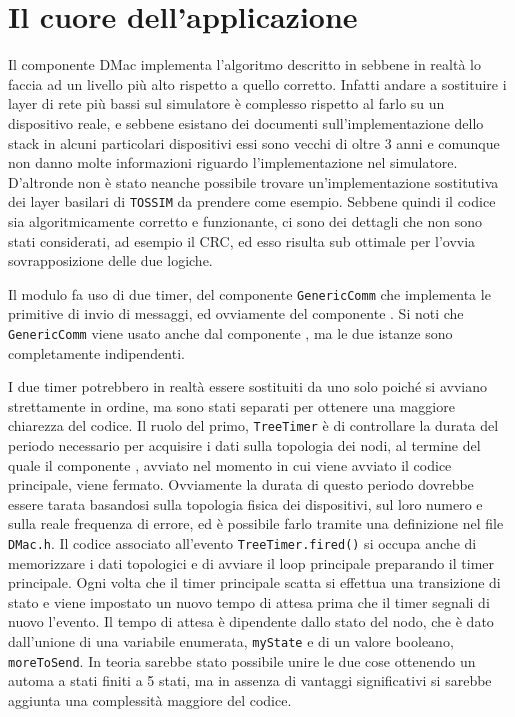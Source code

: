 \documentclass[twoside,11pt,a4paper,italian,openany]{book}
\newcommand{\tos}{\texttt{TOSSIM} }
\begin{document}
\section{Il cuore dell'applicazione}
Il componente DMac implementa l'algoritmo descritto in \cite{DMAC} sebbene in realtà lo faccia 
ad un livello più alto rispetto a quello corretto. Infatti andare a sostituire i layer di rete 
più bassi sul simulatore è complesso rispetto al farlo su un dispositivo reale, 
e sebbene esistano dei documenti sull'implementazione dello stack in alcuni particolari dispositivi\cite{stackpdf} essi sono vecchi di oltre 3 anni e comunque non danno molte informazioni 
riguardo l'implementazione nel simulatore. 
D'altronde non è stato neanche possibile trovare un'implementazione sostitutiva dei layer 
basilari di \tos da prendere come esempio. 
Sebbene quindi il codice sia algoritmicamente corretto e funzionante,
ci sono dei dettagli che non sono stati considerati, ad esempio il CRC, ed esso risulta 
sub ottimale per l'ovvia sovrapposizione delle due logiche. 

Il modulo fa uso di due timer, del componente \texttt{GenericComm}  che implementa le 
primitive di invio di messaggi, ed ovviamente del componente \tree. 
Si noti che \texttt{GenericComm} viene usato anche dal componente \tree, ma le due istanze sono completamente indipendenti.  

I due timer potrebbero in realtà essere sostituiti da uno solo poiché si avviano strettamente
in ordine, ma sono stati separati per ottenere una maggiore chiarezza del codice.
Il ruolo del primo, \texttt{TreeTimer} è di controllare la durata del periodo necessario per
acquisire i dati sulla topologia dei nodi, al termine del quale il componente \tree, avviato 
nel momento in cui viene avviato il codice principale, viene fermato.
Ovviamente la durata di questo periodo dovrebbe essere tarata basandosi sulla topologia fisica 
dei dispositivi, sul loro numero e sulla reale frequenza di errore, ed è possibile farlo 
tramite una definizione nel file \texttt{DMac.h}.
Il codice associato all'evento \texttt{TreeTimer.fired()} si occupa anche di memorizzare 
i dati topologici e di avviare il loop principale preparando il timer principale. 
Ogni volta che il timer principale scatta si effettua una transizione di stato e viene 
impostato un nuovo tempo di attesa prima che il timer segnali di nuovo l'evento. 
Il tempo di attesa è dipendente dallo stato del nodo, che è dato dall'unione di una variabile 
enumerata, \texttt{myState} e di un valore booleano, \texttt{moreToSend}. 
In teoria sarebbe stato possibile unire le due cose ottenendo un automa a stati finiti a 
5 stati, ma in assenza di vantaggi significativi si sarebbe aggiunta una complessità maggiore 
del codice. 
\end{document}
